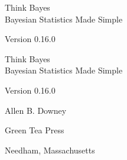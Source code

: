 \documentclass[12pt]{book}
\newcommand{\theversion}{0.16.0}
\begin{document}
\begin{latexonly}

\renewcommand{\blankpage}{\thispagestyle{empty} \quad \newpage}


\thispagestyle{empty}

\begin{flushright}
\vspace*{2.0in}

\begin{spacing}{3}
{\huge Think Bayes}\\
{\Large Bayesian Statistics Made Simple}
\end{spacing}

\vspace{0.25in}

Version \theversion

\vfill

\end{flushright}


\blankpage
\blankpage

\pagebreak
\thispagestyle{empty}

\begin{flushright}
\vspace*{2.0in}

\begin{spacing}{3}
{\huge Think Bayes}\\
{\Large Bayesian Statistics Made Simple}
\end{spacing}

\vspace{0.25in}

Version \theversion

\vspace{1in}


{\Large
Allen B. Downey\\
}


\vspace{0.5in}

{\Large Green Tea Press}

{\small Needham, Massachusetts}

\vfill

\end{flushright}


\pagebreak
\thispagestyle{empty}


\end{latexonly}
\end{document}
